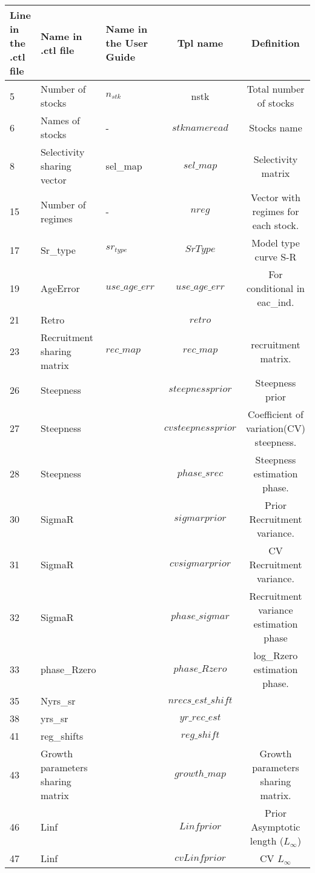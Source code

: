 \documentclass{article}
\begin{document}
\begin{tabular}{|  p{0.9cm} | p{1.9cm}  | p{1.9cm} | c | c |}
\hline
Line in the .ctl file & Name in .ctl file  & Name in the User Guide & Tpl name & Definition\\ \hline  \hline
 5 &  Number of stocks & $n_{stk}$  & nstk & Total number of stocks\\ \hline
6 &  Names of stocks & - & $stknameread$   & Stocks name\\ \hline
8 &  Selectivity sharing vector & sel\_map  & $sel\_map$ & Selectivity matrix\\ \hline
15 &  Number of regimes &  - & $nreg$ & Vector with regimes for each stock.\\ \hline
17 &  Sr\_type & $sr_{type}$  & $SrType$ & Model type curve S-R\\ \hline
19 &  AgeError & $use\_age\_err$  & $use\_age\_err$ & For conditional in eac\_ind.\\ \hline
21 &  Retro &   & $retro$ &\\ \hline
23 & Recruitment sharing matrix &  $rec\_map$ & $rec\_map$ & recruitment matrix.\\ \hline
26 &  Steepness &   & $steepnessprior$ & Steepness prior\\ \hline
27 &  Steepness &   & $cvsteepnessprior$ & Coefficient of variation(CV) steepness.\\ \hline
28 &  Steepness &   & $phase\_srec$ & Steepness estimation phase.\\ \hline
30 &  SigmaR &   & $sigmarprior$ & Prior Recruitment variance.
\\ \hline
31 &  SigmaR &   & $cvsigmarprior$ & CV Recruitment variance.\\ \hline
32 &  SigmaR &   & $phase\_sigmar$ & Recruitment variance estimation phase \\ \hline
33 &  phase\_Rzero &   & $phase\_Rzero$ & log\_Rzero estimation phase.\\ \hline
35 &  Nyrs\_sr &   & $nrecs\_est\_shift$ & \\ \hline
38 &  yrs\_sr &   & $yr\_rec\_est$ &\\ \hline
41 &  reg\_shifts &   & $reg\_shift$ & \\ \hline
43 &  Growth parameters sharing matrix &   & $growth\_map$ & Growth parameters sharing matrix.\\ \hline
46 &  Linf &   & $Linfprior$ & Prior  Asymptotic length ($L_{\infty}$)\\ \hline
47 &  Linf &   & $cvLinfprior$ & CV $L_{\infty}$\\ \hline

\end{tabular}
\end{document}
